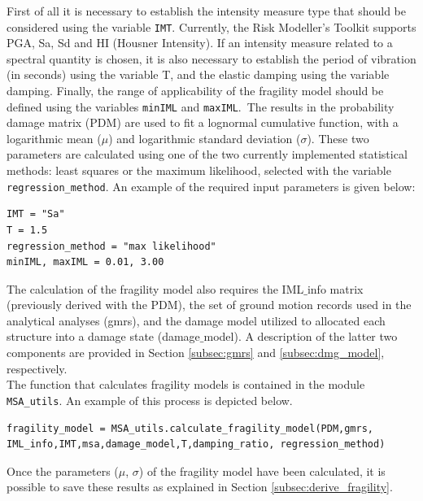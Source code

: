 First of all it is necessary to establish the intensity measure type that should be considered using the variable \verb=IMT=. Currently, the Risk Modeller’s Toolkit supports PGA, Sa, Sd and HI (Housner Intensity). If an intensity measure related to a spectral quantity is chosen, it is also necessary to establish the period of vibration (in seconds) using the variable T, and the elastic damping using the variable damping. Finally, the range of applicability of the fragility model should be defined using the variables \verb=minIML= and \verb=maxIML=.\
The results in the probability damage matrix (PDM) are used to fit a lognormal cumulative function, with a logarithmic mean ($\mu$) and logarithmic standard deviation ($\sigma$). These two parameters are calculated using one of the two currently implemented statistical methods: least squares or the maximum likelihood, selected with the variable \verb=regression_method=. An example of the required input parameters is given below:

\begin{Verbatim}[frame=single, commandchars=\\\{\}, samepage=true]
IMT = "Sa"
T = 1.5
regression_method = "max likelihood"
minIML, maxIML = 0.01, 3.00
\end{Verbatim}

The calculation of the fragility model also requires the IML$\_$info matrix (previously derived with the PDM), the set of ground motion records used in the analytical analyses (gmrs), and the damage model utilized to allocated each structure into a damage state (damage$\_$model). A description of the latter two components are provided in Section \ref{subsec:gmrs} and \ref{subsec:dmg_model}, respectively.\\
The function that calculates fragility models is contained in the module \verb=MSA_utils=. An example of this process is depicted below.

\begin{Verbatim}[frame=single, commandchars=\\\{\}, samepage=true]
fragility_model = MSA_utils.calculate_fragility_model(PDM,gmrs,
IML_info,IMT,msa,damage_model,T,damping_ratio, regression_method)
\end{Verbatim}

Once the parameters ($\mu$, $\sigma$) of the fragility model have been calculated, it is possible to save these results as explained in Section \ref{subsec:derive_fragility}.
